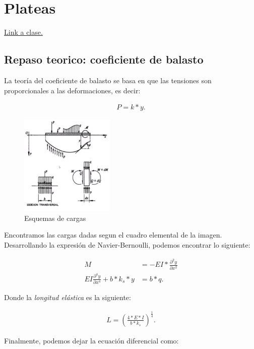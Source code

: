 \documentclass[../main.tex]{subfiles}
\begin{document}
\section{Plateas}

\href{https://youtu.be/-qSCiId3S-c}{Link a clase.}

\subsection{Repaso teorico: coeficiente de balasto}

La teoría del coeficiente de balasto se basa en que las tensiones son proporcionales
a las deformaciones, es decir:

\begin{align*}
  P = k * y 
.\end{align*}

\begin{figure}[ht]
  \centering
  \includegraphics[width=0.4\textwidth]{../images/20210421/balasto}
  \caption{Esquemas de cargas}
  \label{fig:balasto}
\end{figure}

Encontramos las cargas dadas segun el cuadro elemental de la imagen. Desarrollando
la expresión de Navier-Bernoulli, podemos encontrar lo siguiente:

\begin{align*}
  M &= -EI * \frac{\partial^2 y}{\partial x^2} \\[5pt]
  EI \frac{\partial^4 y}{\partial x^4} +b*k_s*y &= b*q 
.\end{align*}

Donde la \textit{longitud elástica} es la siguiente:

\begin{align*}
  L = \left( \frac{4 * E * I}{b * k_s} \right)^{\frac{1}{4}}
.\end{align*}

Finalmente, podemos dejar la ecuación diferencial como:
\end{document}
